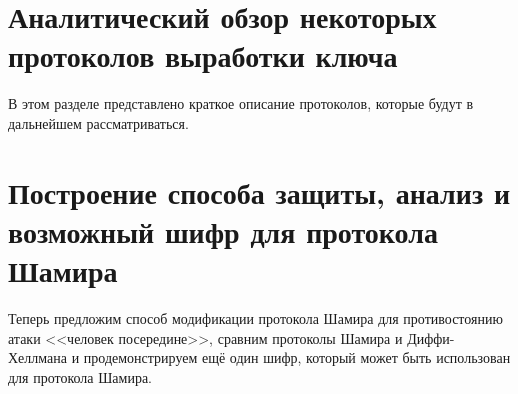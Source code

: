 \section{Аналитический обзор некоторых протоколов выработки ключа}
В этом разделе представлено краткое описание протоколов, которые будут в дальнейшем рассматриваться.

\section{Построение способа защиты, анализ и возможный шифр для протокола Шамира}
Теперь предложим способ модификации протокола Шамира для противостоянию атаки <<человек посередине>>, сравним  протоколы Шамира и Диффи-Хеллмана и продемонстрируем ещё один шифр, который может быть использован для протокола Шамира.


\printbibliography[%
    heading=bibintoc%
]

\appendix
{}


